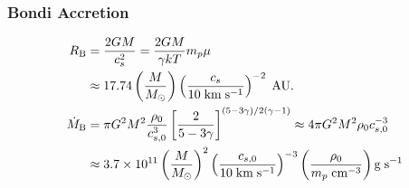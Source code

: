 \begin{multicols}{2}
\subsubsection*{Bondi Accretion}
\footnotesize
\[
\begin{aligned}
    R_{\rm B} &= \frac{2GM}{c_s^2} = \frac{2GM}{\gamma kT} m_p\mu\\
    &\approx 17.74 \left(\frac{M}{M_\odot}\right) \left(\frac{c_s}{10\;{\rm km\;s^{-1}}}\right)^{-2}\;{\rm AU}.\\
    \dot{M}_{\rm B} &= \pi G^2M^2 \frac{\rho_0}{c_{s,0}^3}\left[\frac{2}{5-3\gamma}\right]^{(5-3\gamma)/2(\gamma-1)}\approx 4\pi G^2M^2 \rho_0c_{s,0}^{-3}\\
    &\approx 3.7\times10^{11} \left(\frac{M}{M_\odot}\right)^2 \left(\frac{c_{s,0}}{10\;{\rm km\;s^{-1}}}\right)^{-3} \left(\frac{\rho_0}{m_p\;{\rm cm^{-3}}}\right) {\rm g\;s^{-1}}
\end{aligned}
\]


\vfill\null\columnbreak

\end{multicols}


\restoregeometry
